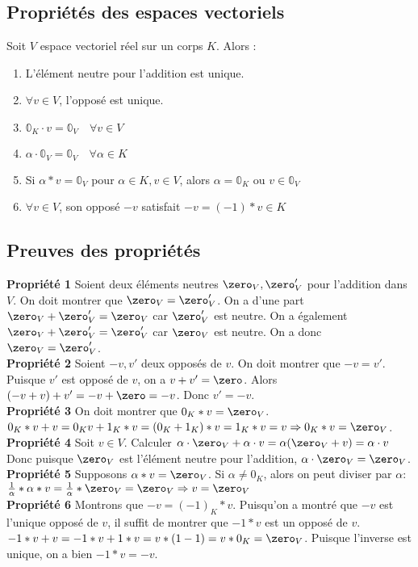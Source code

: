 \documentclass[12pt]{article}
\begin{document}
\subsection{Propriétés des espaces vectoriels}
Soit $V$ espace vectoriel réel sur un corps $K$. Alors :
\begin{enumerate}
    \item L'élément neutre pour l'addition est unique.
    \item $\forall v \in V$, l'opposé est unique.
    \item $\mathbb 0_K \cdot v = \mathbb 0_V \quad \forall v \in V$ 
    \item $\alpha \cdot \mathbb 0_V = \mathbb 0_V \quad \forall \alpha \in K$
    \item Si $\alpha * v = \mathbb 0_V$ pour $\alpha \in K, v \in V$, alors $\alpha = \mathbb 0_K$ ou $v \in \mathbb 0_V$
    \item $\forall v \in V$, son opposé $-v$ satisfait $-v = (-1) * v \in K$
\end{enumerate}

\subsection{Preuves des propriétés}
\textbf{Propriété 1}
Soient deux éléments neutres $\zero_V, \zero_V'$ pour l'addition dans $V$.  On doit montrer que $\zero_V = \zero_V'$.
On a d'une part $\zero_V + \zero_V' = \zero_V$ car $\zero_V'$ est neutre. On a également $\zero_V + \zero_V' = \zero_V'$ car $\zero_V$ est neutre. On a donc $\zero_V = \zero_V'$.
\\
\textbf{Propriété 2}
Soient $-v, v'$ deux opposés de $v$. On doit montrer que $-v = v'$.
Puisque $v'$ est opposé de $v$, on a $v+v' = \zero$. Alors $(-v + v) + v' = -v + \zero = -v$. 
Donc $v'=-v$.
\\
\textbf{Propriété 3}
On doit montrer que $0_K * v = \zero_V$.
$0_K*v+v = 0_Kv+ 1_K *v = (0_K + 1_K)*v = 1_K*v = v \Rightarrow 0_K*v = \zero_V$.
\\
\textbf{Propriété 4}
Soit $v \in V$. Calculer $\alpha \cdot \zero_V + \alpha \cdot v = \alpha ( \zero_V + v) = \alpha \cdot v$
Donc puisque $\zero_V$ est l'élément neutre pour l'addition, $\alpha \cdot \zero_V = \zero_V$.
\\
\textbf{Propriété 5}
Supposons $\alpha *v = \zero_V$. Si $\alpha \neq 0_K$, alors on peut diviser par $\alpha$:
$\frac 1 \alpha * \alpha * v = \frac 1 \alpha * \zero_V = \zero_V \Rightarrow v = \zero_V$
\\
\textbf{Propriété 6}
Montrons que $-v = (-1)_K*v$.
Puisqu'on a montré que $-v$ est l'unique opposé de $v$, il suffit de montrer que $-1*v$ est un opposé de $v$.
$-1*v + v = -1 * v + 1 * v = v * (1 - 1) = v*0_K = \zero_V$. Puisque l'inverse est unique, on a bien $-1*v = -v$.
\end{document}
